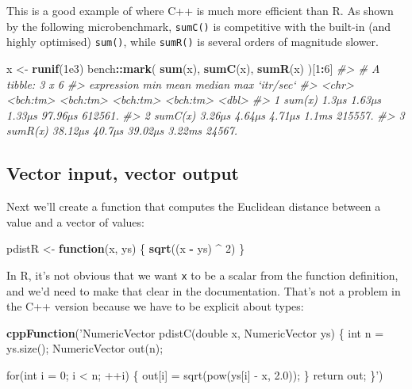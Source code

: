 \documentclass[]{book}
\newenvironment{Shaded}{\begin{snugshade}}{\end{snugshade}}
\newcommand{\CommentTok}[1]{\textcolor[rgb]{0.37,0.37,0.37}{\textit{#1}}}
\newcommand{\ControlFlowTok}[1]{\textcolor[rgb]{0.27,0.27,0.27}{\textbf{#1}}}
\newcommand{\DecValTok}[1]{\textcolor[rgb]{0.06,0.06,0.06}{#1}}
\newcommand{\FloatTok}[1]{\textcolor[rgb]{0.06,0.06,0.06}{#1}}
\newcommand{\KeywordTok}[1]{\textcolor[rgb]{0.27,0.27,0.27}{\textbf{#1}}}
\newcommand{\NormalTok}[1]{#1}
\newcommand{\OperatorTok}[1]{\textcolor[rgb]{0.43,0.43,0.43}{\textbf{#1}}}
\newcommand{\StringTok}[1]{\textcolor[rgb]{0.5,0.5,0.5}{#1}}
\begin{document}
This is a good example of where C++ is much more efficient than R. As shown by the following microbenchmark, \texttt{sumC()} is competitive with the built-in (and highly optimised) \texttt{sum()}, while \texttt{sumR()} is several orders of magnitude slower.

\begin{Shaded}
\begin{Highlighting}[]
\NormalTok{x <-}\StringTok{ }\KeywordTok{runif}\NormalTok{(}\FloatTok{1e3}\NormalTok{)}
\NormalTok{bench}\OperatorTok{::}\KeywordTok{mark}\NormalTok{(}
  \KeywordTok{sum}\NormalTok{(x),}
  \KeywordTok{sumC}\NormalTok{(x),}
  \KeywordTok{sumR}\NormalTok{(x)}
\NormalTok{)[}\DecValTok{1}\OperatorTok{:}\DecValTok{6}\NormalTok{]}
\CommentTok{#> # A tibble: 3 x 6}
\CommentTok{#>   expression      min     mean   median      max `itr/sec`}
\CommentTok{#>   <chr>      <bch:tm> <bch:tm> <bch:tm> <bch:tm>     <dbl>}
\CommentTok{#> 1 sum(x)        1.3µs   1.63µs   1.33µs  97.96µs   612561.}
\CommentTok{#> 2 sumC(x)      3.26µs   4.64µs   4.71µs    1.1ms   215557.}
\CommentTok{#> 3 sumR(x)     38.12µs   40.7µs  39.02µs   3.22ms    24567.}
\end{Highlighting}
\end{Shaded}

\hypertarget{vector-input-vector-output}{%
\subsection{Vector input, vector output}\label{vector-input-vector-output}}

Next we'll create a function that computes the Euclidean distance between a value and a vector of values:

\begin{Shaded}
\begin{Highlighting}[]
\NormalTok{pdistR <-}\StringTok{ }\ControlFlowTok{function}\NormalTok{(x, ys) \{}
  \KeywordTok{sqrt}\NormalTok{((x }\OperatorTok{-}\StringTok{ }\NormalTok{ys) }\OperatorTok{^}\StringTok{ }\DecValTok{2}\NormalTok{)}
\NormalTok{\}}
\end{Highlighting}
\end{Shaded}

In R, it's not obvious that we want \texttt{x} to be a scalar from the function definition, and we'd need to make that clear in the documentation. That's not a problem in the C++ version because we have to be explicit about types:

\begin{Shaded}
\begin{Highlighting}[]
\KeywordTok{cppFunction}\NormalTok{(}\StringTok{'NumericVector pdistC(double x, NumericVector ys) \{}
\StringTok{  int n = ys.size();}
\StringTok{  NumericVector out(n);}

\StringTok{  for(int i = 0; i < n; ++i) \{}
\StringTok{    out[i] = sqrt(pow(ys[i] - x, 2.0));}
\StringTok{  \}}
\StringTok{  return out;}
\StringTok{\}'}\NormalTok{)}
\end{Highlighting}
\end{Shaded}
\end{document}
